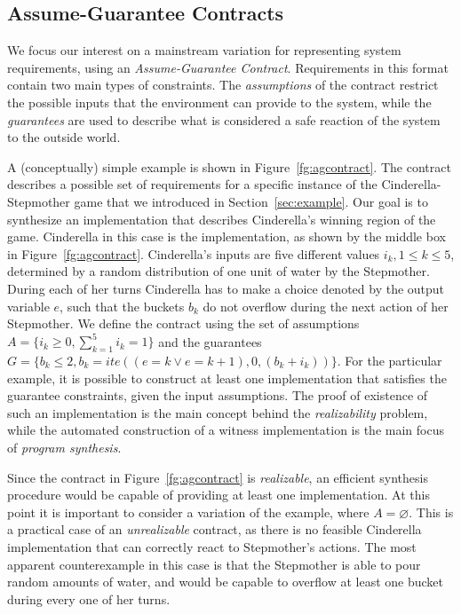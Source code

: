 \subsection{Assume-Guarantee Contracts}
\label{sec:pre}
\fi

We focus our interest on a mainstream variation for representing system requirements, using an \textit{Assume-Guarantee
Contract}. Requirements in this format contain two main types of constraints.
The \emph{assumptions} of the contract restrict the possible inputs that the
environment can provide to the system, while the \emph{guarantees} are used to
describe what is considered a safe reaction of the system to the outside world.

A (conceptually) simple example is shown in Figure~\ref{fg:agcontract}. The contract describes a possible set of requirements for a specific instance of the Cinderella-Stepmother game that we introduced in Section~\ref{sec:example}. Our goal is to synthesize an implementation that describes Cinderella's winning region of the game. Cinderella in this case is the implementation, as shown by the middle box in Figure~\ref{fg:agcontract}. Cinderella's inputs are five different values $i_k, 1 \leq k \leq 5$, determined by a random distribution of one unit of water by the Stepmother. During each of her turns Cinderella has to make a choice denoted by the output variable $e$, such that the buckets $b_k$ do not overflow during the next action of her Stepmother. We define the contract using the set of assumptions $A = \{i_k \geq 0, \sum_{k=1}^{5} i_k = 1\}$ and the guarantees $G = \{b_k \leq 2, b_k = ite((e=k \lor e=k+1), 0, (b_k+i_k))\}$. For the particular example, it is possible to construct at least one implementation that satisfies the guarantee constraints, given the input assumptions. The proof of existence of such an implementation  is the main concept behind the \emph{realizability} problem, while the automated construction of a witness implementation is the main focus of \emph{program synthesis}.


Since the contract in Figure~\ref{fg:agcontract} is \emph{realizable}, an efficient synthesis procedure would be capable of providing at least one
implementation. At this point it is important to consider a variation of the example, where $A = \varnothing$. This is a practical case of an
\emph{unrealizable} contract, as there is no feasible Cinderella implementation that can correctly react to Stepmother's actions. The most apparent counterexample in this case is that the Stepmother is able to pour random amounts of water, and would be capable to overflow at least one bucket during every one of her turns.

